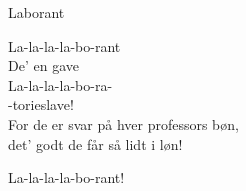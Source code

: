 \begin{song}{Laborant}
  \begin{SBChorus}
    La-la-la-la-bo-rant\\
    De' en gave\\
    La-la-la-la-bo-ra-\\
    -torieslave!\\
    For de er svar på hver professors bøn,\\
    det' godt de får så lidt i løn!
  \end{SBChorus}


  \begin{SBSection*}
    La-la-la-la-bo-rant!
  \end{SBSection*}
\end{song}